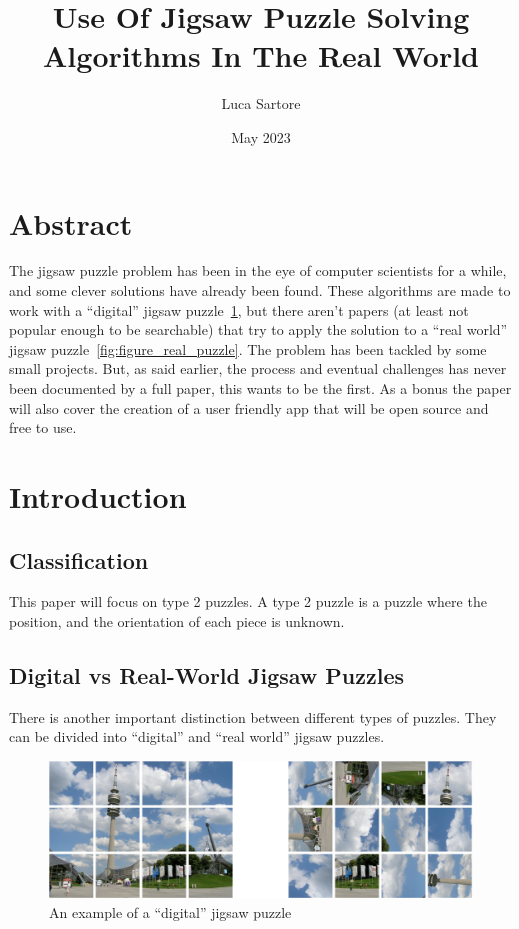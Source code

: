 \documentclass{article}
\title{Use Of Jigsaw Puzzle Solving Algorithms In The Real World}
\author{Luca Sartore}
\date{May 2023}
\begin{document}
\maketitle

\newpage

{
  \hypersetup{linkcolor=black}
  \tableofcontents
}

\newpage

\section{Abstract}
The jigsaw puzzle problem has been in the eye of computer scientists for a while,
and some clever solutions have already been found. These algorithms are made to
work with a “digital” jigsaw puzzle~\ref{fig:figure_digital_puzzle},
but there aren't papers (at least not popular enough to be searchable)
that try to apply the solution
to a “real world” jigsaw puzzle~\ref{fig:figure_real_puzzle}.\newline
The problem has been tackled by some small projects. But, as said earlier,
the process and eventual challenges has never been documented by a full paper,
this wants to be the first.\newline
As a bonus the paper will also cover the creation of a user friendly app
that will be open source and free to use.

\section{Introduction}
\subsection{Classification}
This paper will focus on type 2 puzzles. A type 2 puzzle is a puzzle where the position, and the orientation of each piece is unknown. 
\subsection{Digital vs Real-World Jigsaw Puzzles}

There is  another important distinction between different types of puzzles.
They can be divided into “digital” and “real world” jigsaw puzzles.
\label{document:DigitalVSReal}

\begin{figure}[h]
    \caption{An example of a “digital” jigsaw  puzzle}\label{fig:figure_digital_puzzle}
    \centering
    \includegraphics[height=0.25\textwidth]{pictures/digital_puzzle.png}
\end{figure}
\end{document}
